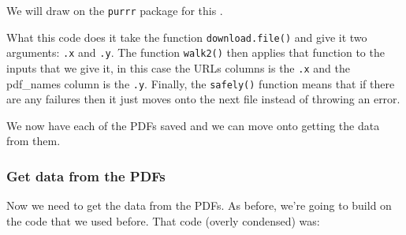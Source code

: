 \documentclass[
]{book}
\newenvironment{Shaded}{\begin{snugshade}}{\end{snugshade}}
\newcommand{\DataTypeTok}[1]{\textcolor[rgb]{0.13,0.29,0.53}{#1}}
\newcommand{\KeywordTok}[1]{\textcolor[rgb]{0.13,0.29,0.53}{\textbf{#1}}}
\newcommand{\NormalTok}[1]{#1}
\newcommand{\OperatorTok}[1]{\textcolor[rgb]{0.81,0.36,0.00}{\textbf{#1}}}
\newcommand{\StringTok}[1]{\textcolor[rgb]{0.31,0.60,0.02}{#1}}
\begin{document}
We will draw on the \texttt{purrr} package for this \citet{citepurrr}.

\begin{Shaded}
\end{Shaded}

\begin{Shaded}
\end{Shaded}

What this code does it take the function \texttt{download.file()} and give it two arguments: \texttt{.x} and \texttt{.y}. The function \texttt{walk2()} then applies that function to the inputs that we give it, in this case the URLs columns is the \texttt{.x} and the pdf\_names column is the \texttt{.y}. Finally, the \texttt{safely()} function means that if there are any failures then it just moves onto the next file instead of throwing an error.

We now have each of the PDFs saved and we can move onto getting the data from them.

\hypertarget{get-data-from-the-pdfs}{%
\subsubsection{Get data from the PDFs}\label{get-data-from-the-pdfs}}

Now we need to get the data from the PDFs. As before, we're going to build on the code that we used before. That code (overly condensed) was:
\end{document}
